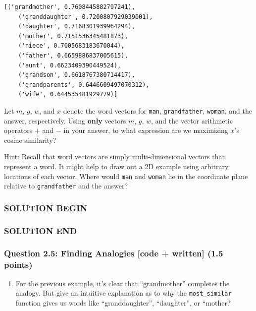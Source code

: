 \documentclass[11pt]{article}
\providecommand{\tightlist}{%
      \setlength{\itemsep}{0pt}\setlength{\parskip}{0pt}}
\begin{document}
\begin{Verbatim}[commandchars=\\\{\}]
    [('grandmother', 0.7608445882797241),
    ('granddaughter', 0.7200807929039001),
    ('daughter', 0.7168301939964294),
    ('mother', 0.7151536345481873),
    ('niece', 0.7005683183670044),
    ('father', 0.6659886837005615),
    ('aunt', 0.6623409390449524),
    ('grandson', 0.6618767380714417),
    ('grandparents', 0.6446609497070312),
    ('wife', 0.644535481929779)]
\end{Verbatim}

Let \(m\), \(g\), \(w\), and \(x\) denote the word vectors for
\texttt{man}, \texttt{grandfather}, \texttt{woman}, and the answer,
respectively. Using \textbf{only} vectors \(m\), \(g\), \(w\), and the
vector arithmetic operators \(+\) and \(-\) in your answer, to what
expression are we maximizing \(x\)'s cosine similarity?

Hint: Recall that word vectors are simply multi-dimensional vectors that
represent a word. It might help to draw out a 2D example using arbitrary
locations of each vector. Where would \texttt{man} and \texttt{woman}
lie in the coordinate plane relative to \texttt{grandfather} and the
answer?

\subsubsection{SOLUTION BEGIN}\label{solution-begin}

\subsubsection{SOLUTION END}\label{solution-end}

\subsubsection{Question 2.5: Finding Analogies {[}code + written{]} (1.5
points)}\label{question-2.5-finding-analogies-code-written-1.5-points}

\begin{enumerate}
    \def\labelenumi{\alph{enumi}.}
    \tightlist
    \item
          For the previous example, it's clear that ``grandmother'' completes
          the analogy. But give an intuitive explanation as to why the
          \texttt{most\_similar} function gives us words like ``granddaughter'',
          ``daughter'', or ``mother?
\end{enumerate}
\end{document}
